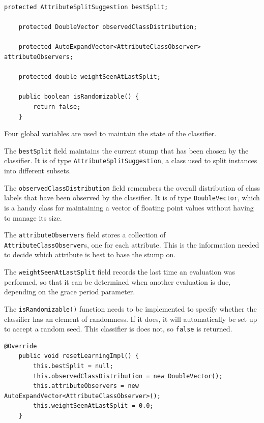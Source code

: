 \documentclass[a4paper,12pt,twoside]{book}
\begin{document}
\begin{lstlisting}[caption={Miscellaneous fields},label=lst:miscfields,firstnumber=25]
	protected AttributeSplitSuggestion bestSplit;

	protected DoubleVector observedClassDistribution;

	protected AutoExpandVector<AttributeClassObserver> attributeObservers;

	protected double weightSeenAtLastSplit;

	public boolean isRandomizable() {
		return false;
	}
\end{lstlisting}

Four global variables are used to maintain the state of the classifier.

The \verb+bestSplit+ field maintains the current stump that has been chosen by the classifier. It is of type \verb+AttributeSplitSuggestion+, a class used to split instances into different subsets.

The \verb+observedClassDistribution+ field remembers the overall distribution of class labels that have been observed by the classifier. It is of type \verb+DoubleVector+, which is a handy class for maintaining a vector of floating point values without having to manage its size.

The \verb+attributeObservers+ field stores a collection of \\ \verb+AttributeClassObserver+s, one for each attribute. This is the information needed to decide which attribute is best to base the stump on.

The \verb+weightSeenAtLastSplit+ field records the last time an evaluation was performed, so that it can be determined when another evaluation is due, depending on the grace period parameter.

The \verb+isRandomizable()+ function needs to be implemented to specify whether the classifier has an element of randomness. If it does, it will automatically be set up to accept a random seed. This classifier is does not, so \verb+false+ is returned.

\begin{lstlisting}[caption={Preparing for learning},label=lst:preplearn,firstnumber=37]
	@Override
	public void resetLearningImpl() {
		this.bestSplit = null;
		this.observedClassDistribution = new DoubleVector();
		this.attributeObservers = new AutoExpandVector<AttributeClassObserver>();
		this.weightSeenAtLastSplit = 0.0;
	}
\end{lstlisting}
\end{document}
